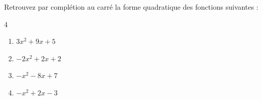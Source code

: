\documentclass[main.tex]{subfiles}
\begin{document}
\vfill 
\begin{exercise}\label{chapitre01:exercice:completioncarre:02} Retrouvez par complétion au carré la forme quadratique des fonctions suivantes :
	\vspace{-1em}
	\begin{multicols}{4} 
		\begin{enumerate}[label={$f_\arabic*(x)=$\rule{0pt}{1.8em}}, leftmargin=*] 
			\item $3x^2+9x+5$  
			\item $-2x^2+2x+2$  
			\item $-x^2-8x+7$  
			\item $-x^2+2x-3$   
		\end{enumerate}
	\end{multicols} 
\end{exercise}
\newpage  
\end{document}
